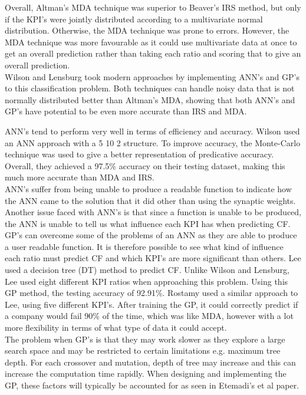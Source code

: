 \documentclass[11pt]{article}
\begin{document}
Overall, Altman's MDA technique was superior to Beaver's IRS method, but only if the KPI's were jointly distributed according to a multivariate normal distribution. Otherwise, the MDA technique was prone to errors. However, the MDA technique was more favourable as it could use multivariate data at once to get an overall prediction rather than taking each ratio and scoring that to give an overall prediction. \\
Wilson and Lensburg took modern approaches by implementing ANN's and GP's to this classification problem. Both techniques can handle noisy data that is not normally distributed better than Altman's MDA, showing that both ANN's and GP's have potential to be even more accurate than IRS and MDA. 

ANN's tend to perform very well in terms of efficiency and accuracy. Wilson used an ANN approach with a 5 10 2 structure. To improve accuracy, the Monte-Carlo technique was used to give a better representation of predicative accuracy. Overall, they achieved a 97.5\% accuracy on their testing dataset, making this much more accurate than MDA and IRS. \\
ANN's suffer from being unable to produce a readable function to indicate how the ANN came to the solution that it did other than using the synaptic weights. Another issue faced with ANN's is that since a function is unable to be produced, the ANN is unable to tell us what influence each KPI has when predicting CF.\\
GP's can overcome some of the problems of an ANN as they are able to produce a user readable function. It is therefore possible to see what kind of influence each ratio must predict CF and which KPI's are more significant than others. Lee used a decision tree (DT) method to predict CF. Unlike Wilson and Lensburg, Lee used eight different KPI ratios when approaching this problem. Using this GP method, the testing accuracy of 92.91\%. Rostamy used a similar approach to Lee, using five different KPI's. After training the GP, it could correctly predict if a company would fail 90\% of the time, which was like MDA, however with a lot more flexibility in terms of what type of data it could accept. \\
The problem when GP's is that they may work slower as they explore a large search space and may be restricted to certain limitations e.g. maximum tree depth. For each crossover and mutation, depth of tree may increase and this can increase the computation time rapidly. When designing and implementing the GP, these factors will typically be accounted for as seen in Etemadi's et al paper. \\
\end{document}

